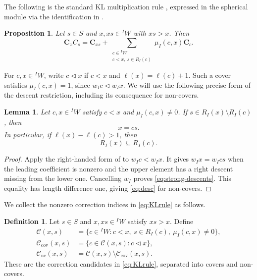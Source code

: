 \documentclass[11pt,a4paper,reqno]{amsart}
\numberwithin{equation}{section}
\newtheorem{proposition}[theorem]{Proposition}
\newtheorem{lemma}[theorem]{Lemma}
\theoremstyle{definition}
\newtheorem{definition}[theorem]{Definition}
\theoremstyle{remark}
\theoremstyle{plain}
\newcommand{\C}{\mathbf C}
\newcommand{\mus}{\mu_I}
\begin{document}
The following is the standard KL multiplication rule
\cite[(2.3.a)--(2.3.c)]{KL}, expressed in the spherical module
via the identification in \cite[Proposition~3.4(1)]{Soergel}.

\begin{proposition}\label{prop:KLrule}
Let $s\in S$ and $x,xs\in{}^I W$ with $xs>x$. Then
\begin{equation}\label{eq:KLrule}
 \C_xC_s=\C_{xs}
 +\sum_{\substack{c\in{}^I W\\c<x,\ s\in R_I(c)}}\mus(c,x)\C_c.
\end{equation}
\end{proposition}

For $c,x\in{}^I W$, write $c\triangleleft x$ if $c<x$ and
$\ell(x)=\ell(c)+1$. Such a cover satisfies $\mus(c,x)=1$,
since $w_Ic\triangleleft w_Ix$. We will use the following precise
form of the descent restriction, including its consequence for non-covers.

\begin{lemma}\label{lem:descents}
Let $c,x\in{}^I W$ satisfy $c<x$ and $\mus(c,x)\ne0$.
If $s\in R_I(x)\setminus R_I(c)$, then
\begin{equation}\label{eq:strong-descents}
 x=cs.
\end{equation}
In particular, if $\ell(x)-\ell(c)>1$, then
\begin{equation}\label{eq:desc}
 R_I(x)\subseteq R_I(c).
\end{equation}
\end{lemma}
\begin{proof}
Apply the right-handed form of \cite[Corollary~5.3]{Casselman}
to $w_Ic<w_Ix$. It gives $w_Ix=w_Ics$ when the leading
coefficient is nonzero and the upper element has a right descent
missing from the lower one. Cancelling $w_I$ proves
\eqref{eq:strong-descents}. This equality has length difference
one, giving \eqref{eq:desc} for non-covers.
\end{proof}

We collect the nonzero correction indices in \eqref{eq:KLrule} as follows.

\begin{definition}\label{def:correction-candidates}
Let $s\in S$ and $x,xs\in{}^I W$ satisfy $xs>x$. Define
\begin{equation}\label{eq:correction-candidates}
\begin{aligned}
 \mathcal C(x,s)
 &=\{c\in{}^I W:c<x,\ s\in R_I(c),\ \mus(c,x)\ne0\},\\
 \mathcal C_{\mathrm{cov}}(x,s)
 &=\{c\in\mathcal C(x,s):c\triangleleft x\},\\
 \mathcal C_{\mathrm{nc}}(x,s)
 &=\mathcal C(x,s)\setminus\mathcal C_{\mathrm{cov}}(x,s).
\end{aligned}
\end{equation}
These are the correction candidates in \eqref{eq:KLrule},
separated into covers and non-covers.
\end{definition}
\end{document}
